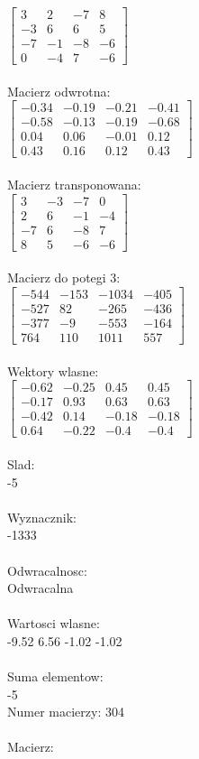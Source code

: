 \documentclass[a4paper,12pt]{article}
\begin{document}
$\begin{bmatrix} 3&2&-7&8\\-3&6&6&5\\-7&-1&-8&-6\\0&-4&7&-6 \end{bmatrix}$
\\
\\
Macierz odwrotna:\\

$\begin{bmatrix} -0.34&-0.19&-0.21&-0.41\\-0.58&-0.13&-0.19&-0.68\\0.04&0.06&-0.01&0.12\\0.43&0.16&0.12&0.43 \end{bmatrix}$
\\
\\
Macierz transponowana:\\

$\begin{bmatrix} 3&-3&-7&0\\2&6&-1&-4\\-7&6&-8&7\\8&5&-6&-6 \end{bmatrix}$
\\
\\
Macierz do potegi 3:\\

$\begin{bmatrix} -544&-153&-1034&-405\\-527&82&-265&-436\\-377&-9&-553&-164\\764&110&1011&557 \end{bmatrix}$
\\
\\
Wektory wlasne:\\

$\begin{bmatrix} -0.62&-0.25&0.45&0.45\\-0.17&0.93&0.63&0.63\\-0.42&0.14&-0.18&-0.18\\0.64&-0.22&-0.4&-0.4 \end{bmatrix}$
\\
\\
Slad:\\
-5
\\
\\
Wyznacznik:\\
-1333
\\
\\
Odwracalnosc:\\
Odwracalna
\\
\\
Wartosci wlasne:\\
-9.52 6.56 -1.02 -1.02
\\
\\
Suma elementow:\\
-5
\\
\newpage
Numer macierzy:
304
\\
\\
Macierz:\\
\end{document}
